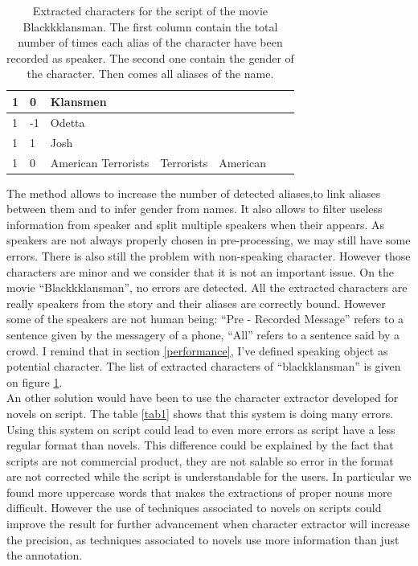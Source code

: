 \documentclass[a4paper, 12pt]{report}
\begin{document}
\begin{table}[]
{\begin{tabular}{|l|l|l|l|l|l|l|}
1                & 0        & Klansmen                   &                  &           &          &            \\ \hline
1                & -1       & Odetta                     &                  &           &          &            \\ \hline
1                & 1        & Josh                       &                  &           &          &            \\ \hline
1                & 0        & American Terrorists        & Terrorists       & American  &          &            \\ \hline
\end{tabular}}
\caption{Extracted characters for the script of the movie Blackkklansman. The first column contain the total number of times each alias of the character have been recorded as speaker. The second one contain the gender of the character. Then comes all aliases of the name. }
\label{character_bkm}
\end{table}


The method allows to increase the number of detected aliases,to link aliases between them and to infer gender from names. It also allows to filter useless information from speaker and split multiple speakers when their appears. As speakers are not always properly chosen in pre-processing, we may still have some errors. There is also still the problem with non-speaking character. However those characters are minor and we consider that it is not an important issue.  On the movie ``Blackkklansman'', no errors are detected. All the extracted characters are really speakers from the story and their aliases are correctly bound. However some of the speakers are not human being: ``Pre - Recorded Message'' refers to a sentence given by the messagery of a phone, ``All'' refers to a sentence said by a crowd. I remind that in section \ref{performance}, I've defined speaking object as potential character. The list of extracted characters of ``blackklansman'' is given on figure \ref{character_bkm}.\\

An other solution would have been to use the character extractor developed for novels on script. The table \ref{tab1} shows that this system is  doing many errors. Using this system on script could lead to even more errors as script have a less regular format than novels. This difference could be explained by the fact that scripts are not commercial product, they are not salable so error in the format are not corrected while the script is understandable for the users. In particular we found more uppercase words that makes the extractions of proper nouns more difficult. However the use of techniques associated to novels on scripts could improve the result for further advancement when character extractor will increase the precision, as techniques associated to novels use more information than just the annotation.\\
\end{document}
